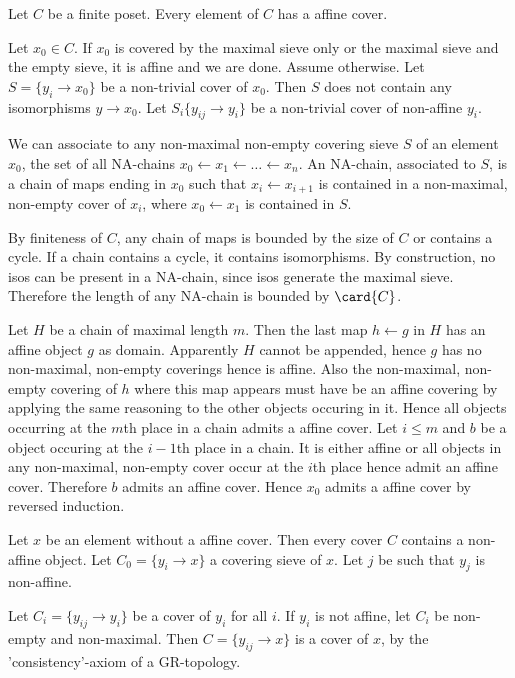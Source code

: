 


\begin{lemma}
Let $C$ be a finite poset. Every element of $C$ has a affine cover.
\end{lemma}

Let $x_0\in C$. 
If $x_0$ is covered by the maximal sieve only or the maximal sieve and the empty sieve, it is affine and we are done. 
Assume otherwise.
Let $S = \{y_i \rightarrow x_0\}$ be a non-trivial cover of $x_0$.
Then $S$ does not contain any isomorphisms $y\rightarrow x_0$.
Let $S_i\{y_{ij}\rightarrow y_i\}$ be a non-trivial cover of non-affine $y_i$.

We can associate to any non-maximal non-empty covering sieve $S$ of an element $x_0$,
the set of all NA-chains $x_0\leftarrow x_1 \leftarrow \ldots \leftarrow x_n$.
An NA-chain, associated to $S$, is a chain of maps ending in $x_0$ such that $x_i \leftarrow x_{i+1}$ is contained in a non-maximal, 
non-empty cover of $x_i$, where $x_0\leftarrow x_1$ is contained in $S$.

By finiteness of $C$, any chain of maps is bounded by the size of $C$ or contains a cycle. 
If a chain contains a cycle, it contains isomorphisms. 
By construction, no isos can be present in a NA-chain, since isos generate the maximal sieve. 
Therefore the length of any NA-chain is bounded by $\card{C}$.

Let $H$ be a chain of maximal length $m$. 
Then the last map $h \leftarrow g$ in $H$ has an affine object $g$ as domain.
Apparently $H$ cannot be appended, hence $g$ has no non-maximal, non-empty coverings hence is affine.
Also the non-maximal, non-empty covering of $h$ where this map appears must have be an affine covering by applying the same reasoning to the other objects occuring in it. 
Hence all objects occurring at the $m$th place in a chain admits a affine cover.
Let $i\leq m$ and $b$ be a object occuring at the $i-1$th place in a chain. 
It is either affine or all objects in any non-maximal, non-empty cover occur at the $i$th place hence admit an affine cover.
Therefore $b$ admits an affine cover. Hence $x_0$ admits a affine cover by reversed induction.




Let $x$ be an element without a affine cover.
Then every cover $C$ contains a non-affine object.
Let $C_0 = \{y_i\rightarrow x\}$ a covering sieve of $x$.
Let $j$ be such that $y_j$ is non-affine.

Let $C_i = \{y_{ij} \rightarrow y_i\}$ be a cover of $y_i$ for all $i$.
If $y_i$ is not affine, let $C_i$ be non-empty and non-maximal.
Then $C = \{y_{ij} \rightarrow x\}$ is a cover of $x$, by the 'consistency'-axiom of a GR-topology.


